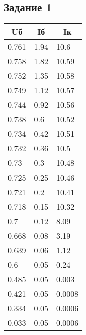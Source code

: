 \documentclass[a4paper,14pt]{article}
\begin{document}
\subsection{ Задание 1}
	\begin{table}[H]
		\begin{tabular}{|l|l|l|}
			\hline
			\multicolumn{1}{|c|}{Uб} & \multicolumn{1}{c|}{Iб} & \multicolumn{1}{c|}{Iк} \\ \hline
			0.761                    & 1.94                    & 10.6                    \\ \hline
			0.758                    & 1.82                    & 10.59                   \\ \hline
			0.752                    & 1.35                    & 10.58                   \\ \hline
			0.749                    & 1.12                    & 10.57                   \\ \hline
			0.744                    & 0.92                    & 10.56                   \\ \hline
			0.738                    & 0.6                     & 10.52                   \\ \hline
			0.734                    & 0.42                    & 10.51                   \\ \hline
			0.732                    & 0.36                    & 10.5                    \\ \hline
			0.73                     & 0.3                     & 10.48                   \\ \hline
			0.725                    & 0.25                    & 10.46                   \\ \hline
			0.721                    & 0.2                     & 10.41                   \\ \hline
			0.718                    & 0.15                    & 10.32                   \\ \hline
			0.7                      & 0.12                    & 8.09                    \\ \hline
			0.668                    & 0.08                    & 3.19                    \\ \hline
			0.639                    & 0.06                    & 1.12                    \\ \hline
			0.6                      & 0.05                    & 0.24                    \\ \hline
			0.485                    & 0.05                    & 0.003                   \\ \hline
			0.421                    & 0.05                    & 0.0008                  \\ \hline
			0.334                    & 0.05                    & 0.0006                  \\ \hline
			0.033                    & 0.05                    & 0.0006                  \\ \hline
		\end{tabular}
	\end{table}
\end{document}
